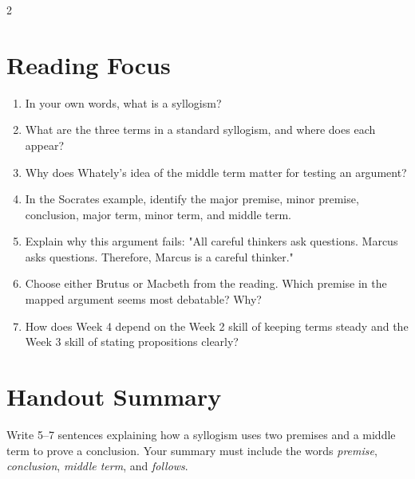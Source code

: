 \documentclass[12pt]{article}
\begin{document}
\begin{multicols}{2}
\section*{Reading Focus}
\begin{enumerate}[leftmargin=*]
\item In your own words, what is a syllogism?
\item What are the three terms in a standard syllogism, and where does each appear?
\item Why does Whately's idea of the middle term matter for testing an argument?
\item In the Socrates example, identify the major premise, minor premise, conclusion, major term, minor term, and middle term.
\item Explain why this argument fails: "All careful thinkers ask questions. Marcus asks questions. Therefore, Marcus is a careful thinker."
\item Choose either Brutus or Macbeth from the reading. Which premise in the mapped argument seems most debatable? Why?
\item How does Week 4 depend on the Week 2 skill of keeping terms steady and the Week 3 skill of stating propositions clearly?
\end{enumerate}

\section*{Handout Summary}
Write 5--7 sentences explaining how a syllogism uses two premises and a middle term to prove a conclusion. Your summary must include the words \textit{premise}, \textit{conclusion}, \textit{middle term}, and \textit{follows}.
\end{multicols}
\end{document}
